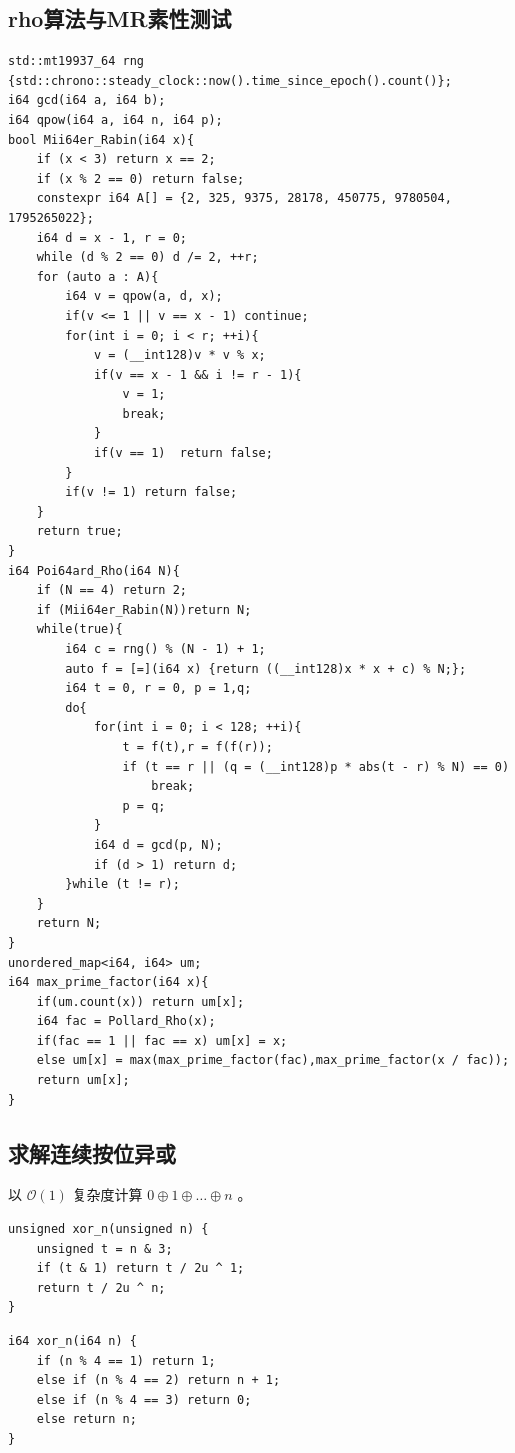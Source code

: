 \subsection{rho算法与MR素性测试}
\begin{lstlisting}[caption={}]
std::mt19937_64 rng {std::chrono::steady_clock::now().time_since_epoch().count()};
i64 gcd(i64 a, i64 b);
i64 qpow(i64 a, i64 n, i64 p);
bool Mii64er_Rabin(i64 x){
    if (x < 3) return x == 2;
    if (x % 2 == 0) return false;
    constexpr i64 A[] = {2, 325, 9375, 28178, 450775, 9780504, 1795265022};
	i64 d = x - 1, r = 0;
    while (d % 2 == 0) d /= 2, ++r;
    for (auto a : A){
        i64 v = qpow(a, d, x);
        if(v <= 1 || v == x - 1) continue;
        for(int i = 0; i < r; ++i){
            v = (__int128)v * v % x;
            if(v == x - 1 && i != r - 1){
                v = 1;
                break;
            }
            if(v == 1)  return false;
        }
        if(v != 1) return false;
    }
    return true;
}
i64 Poi64ard_Rho(i64 N){
    if (N == 4) return 2;
    if (Mii64er_Rabin(N))return N;
    while(true){
        i64 c = rng() % (N - 1) + 1;
        auto f = [=](i64 x) {return ((__int128)x * x + c) % N;};
        i64 t = 0, r = 0, p = 1,q;
        do{
            for(int i = 0; i < 128; ++i){
                t = f(t),r = f(f(r));
                if (t == r || (q = (__int128)p * abs(t - r) % N) == 0)
                    break;
                p = q;
            }
            i64 d = gcd(p, N);
            if (d > 1) return d;
        }while (t != r);
    }
	return N;
}
unordered_map<i64, i64> um;
i64 max_prime_factor(i64 x){
    if(um.count(x)) return um[x];
    i64 fac = Pollard_Rho(x);
    if(fac == 1 || fac == x) um[x] = x;
    else um[x] = max(max_prime_factor(fac),max_prime_factor(x / fac));
    return um[x];
}
\end{lstlisting}

\subsection{求解连续按位异或}
以 $\mathcal O(1)$ 复杂度计算 $0\oplus1\oplus\dots\oplus n$ 。
\begin{lstlisting}[caption={}]
unsigned xor_n(unsigned n) {
    unsigned t = n & 3;
    if (t & 1) return t / 2u ^ 1;
    return t / 2u ^ n;
}
\end{lstlisting}
\begin{lstlisting}[caption={}]
i64 xor_n(i64 n) {
    if (n % 4 == 1) return 1;
    else if (n % 4 == 2) return n + 1;
    else if (n % 4 == 3) return 0;
    else return n;
}
\end{lstlisting}

